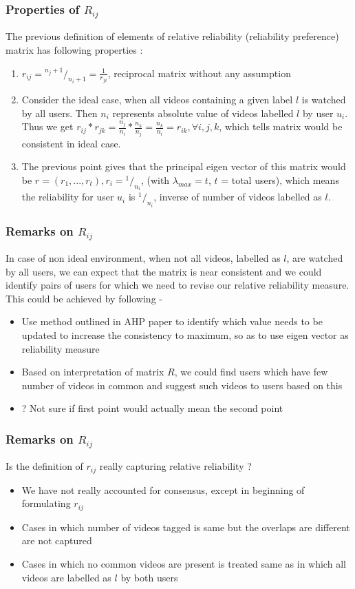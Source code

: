 \documentclass{beamer}
\newcommand*\rfrac[2]{{}^{#1}\!/_{#2}}
\begin{document}
\begin{frame}
\frametitle{Properties of $R_{ij}$}
The previous definition of elements of relative reliability (reliability preference) matrix has following properties :
\begin{enumerate}
  \item $r_{ij} = \rfrac{n_j + 1}{n_i + 1} = \frac{1}{r_{ji}}$, reciprocal matrix without any assumption
  \item Consider the ideal case, when all videos containing a given label $l$ is watched by all users. Then $n_i$ represents absolute value of videos labelled $l$ by user $u_i$. Thus we get $r_{ij} * r_{jk} = \frac{n_j}{n_i} * \frac{n_k}{n_j} = \frac{n_k}{n_i} = r_{ik}, \forall i,j,k$, which tells matrix would be consistent in ideal case. 
  \item The previous point gives that the principal eigen vector of this matrix would be $r = (r_1,...,r_t), r_i = \rfrac{1}{n_i}$, (with $\lambda_{max} = t$, $t$ = total users), which means the reliability for user $u_i$ is $\rfrac{1}{n_i}$, inverse of number of videos labelled as $l$. 
\end{enumerate}
\end{frame}


\begin{frame}
\frametitle{Remarks on $R_{ij}$}
In case of non ideal environment, when not all videos, labelled as $l$, are watched by all users, we can expect that the matrix is near consistent and we could identify pairs of users for which we need to revise our relative reliability measure. This could be achieved by following - 
\begin{itemize}
  \item Use method outlined in AHP paper to identify which value needs to be updated to increase the consistency to maximum, so as to use eigen vector as reliability measure
  \item Based on interpretation of matrix $R$, we could find users which have few number of videos in common and suggest such videos to users based on this
  \item ? Not sure if first point would actually mean the second point
\end{itemize}
\end{frame}


\begin{frame}
\frametitle{Remarks on $R_{ij}$}
Is the definition of $r_{ij}$ really capturing relative reliability ?
\begin{itemize}
  \item We have not really accounted for consensus, except in beginning of formulating $r_{ij}$ 
  \item Cases in which number of videos tagged is same but the overlaps are different are not captured
  \item Cases in which no common videos are present is treated same as in which all videos are labelled as $l$ by both users
\end{itemize}
\end{frame}
\end{document}
